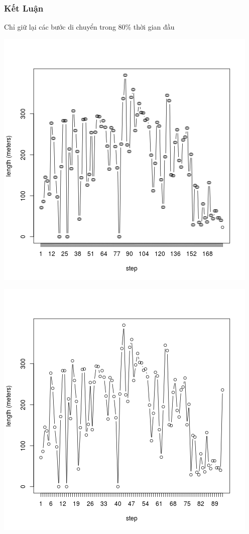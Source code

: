 \documentclass[t]{beamer}
\begin{document}

\begin{frame}[t]
\frametitle{Kết Luận}Chỉ giữ lại các bước di chuyển trong 80\% thời gian đầu\\
\begin{center}
\begin{minipage}{0.48\linewidth}
\includegraphics[width=\linewidth]{test1}
\end{minipage}%
\hfill
\begin{minipage}{0.49\linewidth}
\includegraphics[width=\linewidth]{test_80_1}
\end{minipage}
\end{center}
\end{frame}
\end{document}

